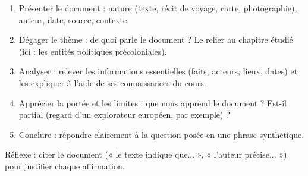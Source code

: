 \documentclass[11pt]{article}
\newcommand{\cle}[1]{{\popxbold\color{popdark}#1}}
\begin{document}
\begin{methode}
\begin{enumerate}
\item \cle{Présenter le document} : nature (texte, récit de voyage, carte, photographie), auteur, date, source, contexte.
\item \cle{Dégager le thème} : de quoi parle le document ? Le relier au chapitre étudié (ici : les entités politiques précoloniales).
\item \cle{Analyser} : relever les informations essentielles (faits, acteurs, lieux, dates) et les expliquer à l'aide de ses connaissances du cours.
\item \cle{Apprécier la portée et les limites} : que nous apprend le document ? Est-il partial (regard d'un explorateur européen, par exemple) ?
\item \cle{Conclure} : répondre clairement à la question posée en une phrase synthétique.
\end{enumerate}
Réflexe : citer le document (« le texte indique que... », « l'auteur précise... ») pour justifier chaque affirmation.
\end{methode}
\end{document}
